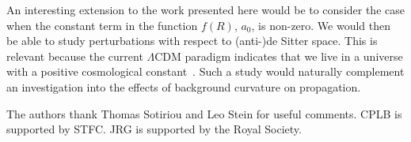 \documentclass[aps,prd,amsfonts,amssymb,amsmath,nofootinbib,reprint,showpacs]{revtex4-1}
\begin{document}
An interesting extension to the work presented here would be to consider the case when the constant term in the function $f(R)$, $a_0$, is non-zero. We would then be able to study perturbations with respect to (anti-)de Sitter space. This is relevant because the current $\Lambda$CDM paradigm indicates that we live in a universe with a positive cosmological constant~\cite{Jarosik2011, Komatsu2011}. Such a study would naturally complement an investigation into the effects of background curvature on propagation.

\begin{acknowledgments}
The authors thank Thomas Sotiriou and Leo Stein for useful comments. CPLB is supported by STFC. JRG is supported by the Royal Society.
\end{acknowledgments}


\end{document}
